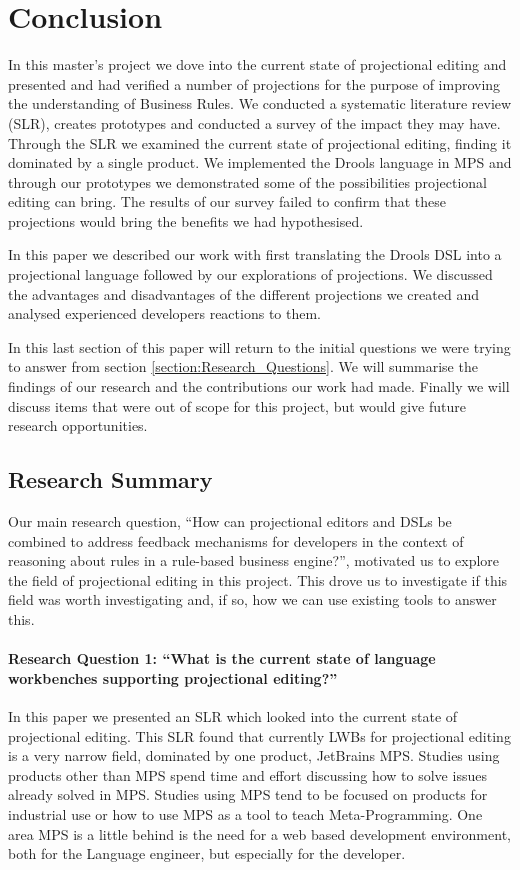 \chapter{Conclusion}\label{chapter:Conclusion}

In this master's project we dove into the current state of projectional editing and presented and had verified a number of projections for the purpose of improving the understanding of Business Rules.
We conducted a systematic literature review (SLR), creates prototypes and conducted a survey of the impact they may have.
Through the SLR we examined the current state of projectional editing, finding it dominated by a single product.
We implemented the Drools language in MPS and through our prototypes we demonstrated some of the possibilities projectional editing can bring.
The results of our survey failed to confirm that these projections would bring the benefits we had hypothesised.

In this paper we described our work with first translating the Drools DSL into a projectional language followed by our explorations of projections.
We discussed the advantages and disadvantages of the different projections we created and analysed experienced developers reactions to them.

In this last section of this paper will return to the initial questions we were trying to answer from section \ref{section:Research_Questions}.
We will summarise the findings of our research and the contributions our work had made.
Finally we will discuss items that were out of scope for this project, but would give future research opportunities.

\section{Research Summary}
Our main research question, ``How can projectional editors and DSLs be combined to address feedback mechanisms for developers in the context of reasoning about rules in a rule-based business engine?'', motivated us to explore the field of projectional editing in this project.
This drove us to investigate if this field was worth investigating and, if so, how we can use existing tools to answer this.

\subsubsection{Research Question 1: ``What is the current state of language workbenches supporting projectional editing?''}
In this paper we presented an SLR which looked into the current state of projectional editing.
This SLR found that currently LWBs for projectional editing is a very narrow field, dominated by one product, JetBrains MPS.
Studies using products other than MPS spend time and effort discussing how to solve issues already solved in MPS.
Studies using MPS tend to be focused on products for industrial use or how to use MPS as a tool to teach Meta-Programming.
One area MPS is a little behind is the need for a web based development environment, both for the Language engineer, but especially for the developer.

